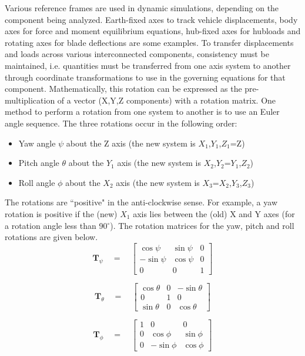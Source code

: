 Various reference frames are used in dynamic simulations, depending on the component being analyzed. Earth-fixed axes to track vehicle displacements, body axes for force and moment equilibrium equations, hub-fixed axes for hubloads and rotating axes for blade deflections are some examples. To transfer displacements and loads across various interconnected components, consistency must be maintained, i.e. quantities must be transferred from one axis system to another through coordinate transformations to use in the governing equations for that component. Mathematically, this rotation can be expressed as the pre-multiplication of a vector (X,Y,Z components) with a rotation matrix. One method to perform a rotation from one system to another is to use an Euler angle sequence. The three rotations occur in the following order:
\begin{itemize}
\item Yaw angle $\psi$ about the Z axis (the new system is $X_1$,$Y_1$,$Z_1$=Z)
\item Pitch angle $\theta$ about the $Y_1$ axis (the new system is $X_2$,$Y_2$=$Y_1$,$Z_2$)
\item Roll angle $\phi$ about the $X_2$ axis (the new system is $X_3$=$X_2$,$Y_3$,$Z_3$)
\end{itemize}
The rotations are ``positive" in the anti-clockwise sense. For example, a yaw rotation is positive if the (new) $X_1$ axis lies between the (old) X and Y axes (for a rotation angle less than 90$^\circ$). The rotation matrices for the yaw, pitch and roll rotations are given below.
\begin{equation*}
\textbf{T}_\psi \quad = \quad\begin{bmatrix} \cos \psi & \sin \psi & 0 \\ -\sin \psi & \cos \psi & 0 \\ 0 & 0 & 1 \end{bmatrix}
\end{equation*}

\begin{equation*}
\textbf{T}_\theta \quad = \quad \begin{bmatrix} \cos \theta & 0 & -\sin \theta \\ 0 & 1 & 0 \\ \sin \theta & 0 & \cos \theta \end{bmatrix}
\end{equation*}

\begin{equation*}
\textbf{T}_\phi \quad = \quad \begin{bmatrix} 1 & 0 & 0 \\ 0 & \cos \phi & \sin \phi \\ 0 & -\sin \phi & \cos \phi \end{bmatrix}
\end{equation*}


